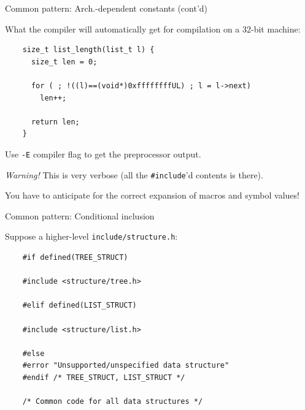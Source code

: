 \begin{frame}[fragile]{Common pattern: Arch.-dependent constants (cont'd)}

  What the compiler will automatically get for compilation on a 32-bit machine:
  
  \begin{lstlisting}
    size_t list_length(list_t l) {
      size_t len = 0;

      for ( ; !((l)==(void*)0xffffffffUL) ; l = l->next)
        len++;

      return len;
    }
  \end{lstlisting}

  Use \lstinline{-E} compiler flag to get the preprocessor output.

  {\em Warning!} This is very verbose (all the \lstinline{#include}'d contents is there).

  You have to anticipate for the correct expansion of macros and symbol values!
  
\end{frame}
  
\begin{frame}[fragile]{Common pattern: Conditional inclusion}

  Suppose a higher-level \lstinline{include/structure.h}:
  
  \begin{lstlisting}
    #if defined(TREE_STRUCT)

    #include <structure/tree.h>

    #elif defined(LIST_STRUCT)

    #include <structure/list.h>

    #else
    #error "Unsupported/unspecified data structure"
    #endif /* TREE_STRUCT, LIST_STRUCT */

    /* Common code for all data structures */
  \end{lstlisting}

\end{frame}

